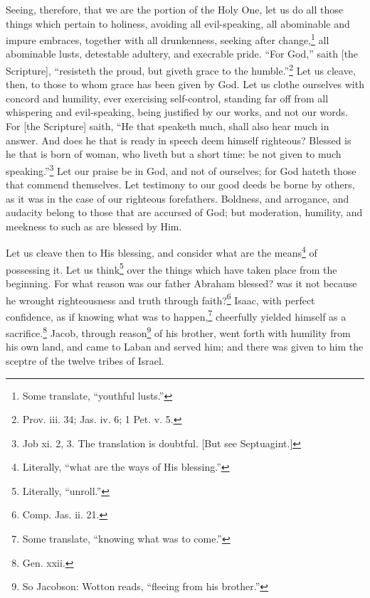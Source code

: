 
Seeing, therefore, that we are the portion of the Holy One, let us do all those things which pertain to holiness, avoiding all evil-speaking, all abominable and impure embraces, together with all drunkenness, seeking after change,\footnote{Some translate, “youthful lusts.”} all abominable lusts, detestable adultery, and execrable pride. “For God,” saith [the Scripture], “resisteth the proud, but giveth grace to the humble.”\footnote{Prov. iii. 34; Jas. iv. 6; 1 Pet. v. 5.} Let us cleave, then, to those to whom grace has been given by God. Let us clothe ourselves with concord and humility, ever exercising self-control, standing far off from all whispering and evil-speaking, being justified by our works, and not our words. For [the Scripture] saith, “He that speaketh much, shall also hear much in answer. And does he that is ready in speech deem himself righteous? Blessed is he that is born of woman, who liveth but a short time: be not given to much speaking.”\footnote{Job xi. 2, 3. The translation is doubtful. [But see Septuagint.]} Let our praise be in God, and not of ourselves; for God hateth those that commend themselves. Let testimony to our good deeds be borne by others, as it was in the case of our righteous forefathers. Boldness, and arrogance, and audacity belong to those that are accursed of God; but moderation, humility, and meekness to such as are blessed by Him.


Let us cleave then to His blessing, and consider what are the means\footnote{Literally, “what are the ways of His blessing.”} of possessing it. Let us think\footnote{Literally, “unroll.”} over the things which have taken place from the beginning. For what reason was our father Abraham blessed? was it not because he wrought righteousness and truth through faith?\footnote{Comp. Jas. ii. 21.} Isaac, with perfect confidence, as if knowing what was to happen,\footnote{Some translate, “knowing what was to come.”} cheerfully yielded himself as a sacrifice.\footnote{Gen. xxii.} Jacob, through reason\footnote{So Jacobson: Wotton reads, “fleeing from his brother.”} of his brother, went forth with humility from his own land, and came to Laban and served him; and there was given to him the sceptre of the twelve tribes of Israel.


